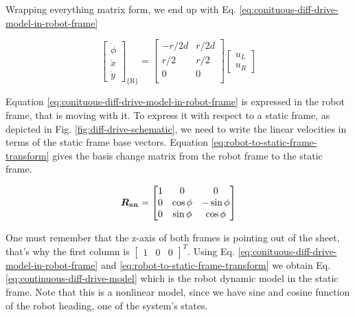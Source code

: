 \documentclass[12pt]{article}
\begin{document}
Wrapping everything matrix form, we end up with Eq. \ref{eq:conituous-diff-drive-model-in-robot-frame}

\begin{equation}
    \begin{bmatrix}
        \dot{\phi} \\ \dot{x} \\ \dot{y}
    \end{bmatrix}_{\{\mathrm{R}\}}= \begin{bmatrix}
        -r/2d & r/2d \\
        r/2 & r/2 \\
        0 & 0 \\
    \end{bmatrix} \begin{bmatrix} u_L \\ u_R \end{bmatrix}
    \label{eq:conituous-diff-drive-model-in-robot-frame}
\end{equation}

Equation \ref{eq:conituous-diff-drive-model-in-robot-frame} is expressed in the robot frame, that is moving with it. To express it with respect to a static frame, as depicted in Fig. \ref{fig:diff-drive-schematic}, we need to write the linear velocities in terms of the static frame base vectors. Equation \ref{eq:robot-to-static-frame-transform} gives the basis change matrix from the robot frame to the static frame.

\begin{equation}
    \boldsymbol{R_{\mathsmaller{\mathrm{SR}}}} = \begin{bmatrix}
        1 & 0 & 0 \\
        0 & \cos\phi & -\sin\phi \\
        0 & \sin\phi & \cos\phi \\
    \end{bmatrix}
    \label{eq:robot-to-static-frame-transform}
\end{equation}

One must remember that the z-axis of both frames is pointing out of the sheet, that's why the first column is $\begin{bmatrix} 1 & 0 & 0 \end{bmatrix}^T$. Using Eq. \ref{eq:conituous-diff-drive-model-in-robot-frame} and \ref{eq:robot-to-static-frame-transform} we obtain Eq. \ref{eq:continuous-diff-drive-model} which is the robot dynamic model in the static frame. Note that this is a nonlinear model, since we have sine and cosine function of the robot heading, one of the system's states.
\end{document}
